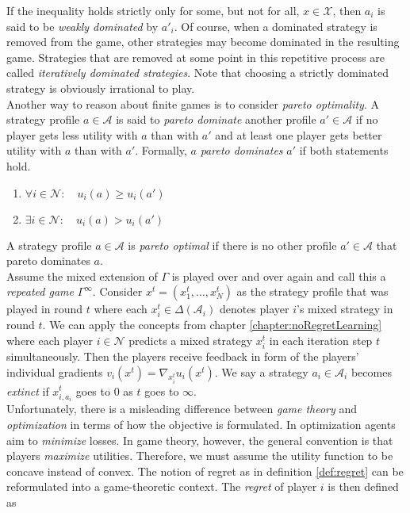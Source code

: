If the inequality holds strictly only for some, but not for all, $x \in \mathcal{X}$, then $a_i$ is said to be \textit{weakly dominated} by $a'_i$. Of course, when a dominated strategy is removed from the game, other strategies may become dominated in the resulting game. Strategies that are removed at some point in this repetitive process are called \textit{iteratively dominated strategies}. Note that choosing a strictly dominated strategy is obviously irrational to play. \\

Another way to reason about finite games is to consider \textit{pareto optimality}. A strategy profile $a \in \mathcal{A}$ is said to \textit{pareto dominate} another profile $a' \in \mathcal{A}$ if no player gets less utility with $a$ than with $a'$ and at least one player gets better utility with $a$ than with $a'$. Formally, $a$ \textit{pareto dominates} $a'$ if both statements hold.

\begin{enumerate}\centering
    \item $\forall i \in \mathcal{N}: \quad u_i(a) \ge u_i(a')$
    \item $\exists i \in \mathcal{N}: \quad u_i(a) > u_i(a')$
\end{enumerate}

A strategy profile $a \in \mathcal{A}$ is \textit{pareto optimal} if there is no other profile $a' \in \mathcal{A}$ that pareto dominates $a$. \\

Assume the mixed extension of $\Gamma$ is played over and over again and call this a \textit{repeated game} $\Gamma^{\infty}$. Consider $x^t = (x_{1}^{t},\dots,x_{N}^{t})$ as the strategy profile that was played in round $t$ where each $x_{i}^{t} \in \Delta(\mathcal{A}_i)$ denotes player $i$'s mixed strategy in round $t$. We can apply the concepts from chapter \ref{chapter:noRegretLearning} where each player $i \in \mathcal{N}$ predicts a mixed strategy $x_{i}^{t}$ in each iteration step $t$ simultaneously. Then the players receive feedback in form of the players' individual gradients $v_{i}(x^t) = \nabla_{x_{i}^{t}}u_{i}(x^t)$. We say a strategy $a_i \in \mathcal{A}_i$ becomes \textit{extinct} if $x_{i,a_i}^t$ goes to $0$ as $t$ goes to $\infty$. \\

Unfortunately, there is a misleading difference between \textit{game theory} and \textit{optimization} in terms of how the objective is formulated. In optimization agents aim to \textit{minimize} losses. In game theory, however, the general convention is that players \textit{maximize} utilities. Therefore, we must assume the utility function to be concave instead of convex. The notion of regret as in definition \ref{def:regret} can be reformulated into a game-theoretic context. The \textit{regret} of player $i$ is then defined as

